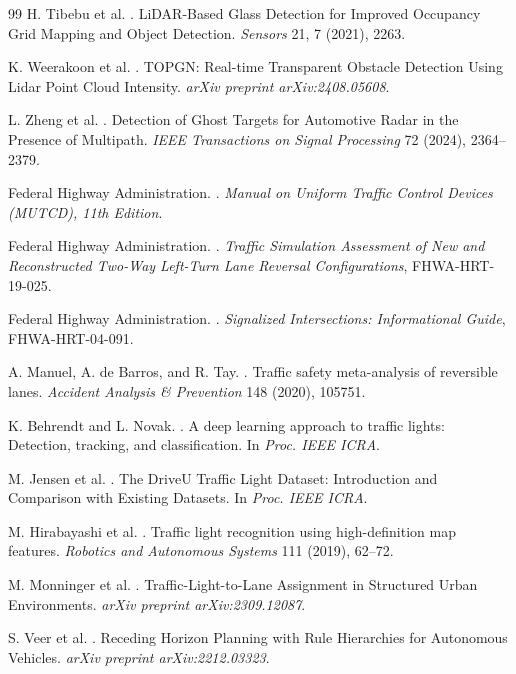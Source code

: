 \documentclass[sigconf,nonacm]{acmart}
\begin{document}
\begin{thebibliography}{99}
H. Tibebu et al.
.
\newblock LiDAR-Based Glass Detection for Improved Occupancy Grid Mapping and Object Detection.
\newblock \textit{Sensors} 21, 7 (2021), 2263.

K. Weerakoon et al.
.
\newblock TOPGN: Real-time Transparent Obstacle Detection Using Lidar Point Cloud Intensity.
\newblock \textit{arXiv preprint arXiv:2408.05608}.

L. Zheng et al.
.
\newblock Detection of Ghost Targets for Automotive Radar in the Presence of Multipath.
\newblock \textit{IEEE Transactions on Signal Processing} 72 (2024), 2364--2379.

Federal Highway Administration.
.
\newblock \textit{Manual on Uniform Traffic Control Devices (MUTCD), 11th Edition}.

Federal Highway Administration.
.
\newblock \textit{Traffic Simulation Assessment of New and Reconstructed Two-Way Left-Turn Lane Reversal Configurations}, FHWA-HRT-19-025.

Federal Highway Administration.
.
\newblock \textit{Signalized Intersections: Informational Guide}, FHWA-HRT-04-091.

A. Manuel, A. de Barros, and R. Tay.
.
\newblock Traffic safety meta-analysis of reversible lanes.
\newblock \textit{Accident Analysis \& Prevention} 148 (2020), 105751.

K. Behrendt and L. Novak.
.
\newblock A deep learning approach to traffic lights: Detection, tracking, and classification.
\newblock In \textit{Proc. IEEE ICRA}.

M. Jensen et al.
.
\newblock The DriveU Traffic Light Dataset: Introduction and Comparison with Existing Datasets.
\newblock In \textit{Proc. IEEE ICRA}.

M. Hirabayashi et al.
.
\newblock Traffic light recognition using high-definition map features.
\newblock \textit{Robotics and Autonomous Systems} 111 (2019), 62--72.

M. Monninger et al.
.
\newblock Traffic-Light-to-Lane Assignment in Structured Urban Environments.
\newblock \textit{arXiv preprint arXiv:2309.12087}.

S. Veer et al.
.
\newblock Receding Horizon Planning with Rule Hierarchies for Autonomous Vehicles.
\newblock \textit{arXiv preprint arXiv:2212.03323}.


\end{thebibliography}
\end{document}
